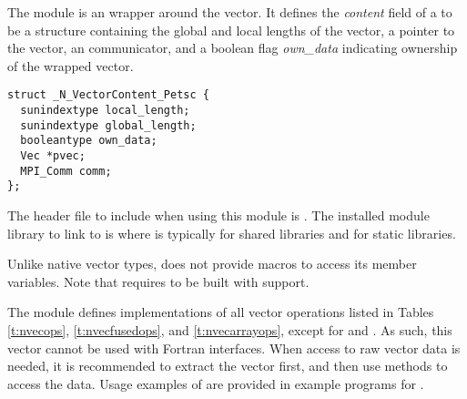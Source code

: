 %
The {\nvecpetsc} module is an {\nvector} wrapper around the {\petsc} vector.
It defines the {\em content} field of a  to be a structure containing
the global and local lengths of the vector, a pointer to the {\petsc} vector,
an {\mpi} communicator, and a boolean flag {\em own\_data} indicating ownership of 
the wrapped {\petsc} vector.
\begin{verbatim} 
struct _N_VectorContent_Petsc {
  sunindextype local_length;
  sunindextype global_length;
  booleantype own_data;
  Vec *pvec;
  MPI_Comm comm;
};
\end{verbatim}

The header file to include when using this module is .
The installed module library to link to is
where  is typically  for shared libraries and 
for static libraries.

Unlike native {\sundials} vector types, {\nvecpetsc} does not provide macros 
to access its member variables.
Note that {\nvecpetsc} requires {\sundials} to be built with {\mpi} support.


The {\nvecpetsc} module defines implementations of all vector operations listed 
in Tables \ref{t:nvecops}, \ref{t:nvecfusedops}, and \ref{t:nvecarrayops}, except for
 and . As such, this vector cannot be
used with {\sundials} Fortran interfaces.
When access to raw vector data is needed, it is 
recommended to extract the {\petsc} vector first, and then use {\petsc} 
methods to access the data. Usage examples of {\nvecpetsc} are provided in
example programs for {\ida} \cite{ida_ex}.

